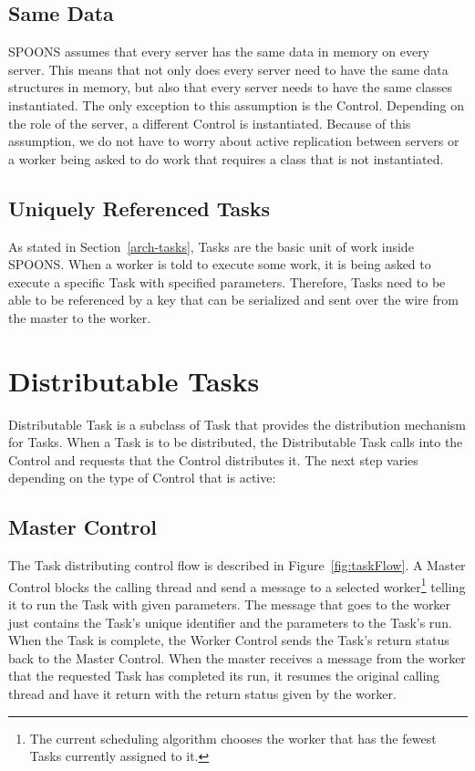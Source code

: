 \documentclass[12pt]{ucthesis}
\begin{document}
\subsection{Same Data}
SPOONS assumes that every server has the same data in memory on every server.
This means that not only does every server need to have the same data structures in memory,
but also that every server needs to have the same classes instantiated. The only exception to this
assumption is the Control. Depending on the role of the server, a different Control is
instantiated. Because of this assumption, we do not have to worry about active replication
between servers or a worker being asked to do work that requires a class that is not instantiated.

\subsection{Uniquely Referenced Tasks}
As stated in Section~\ref{arch-tasks}, Tasks are the basic unit of work inside SPOONS.
When a worker is told to execute some work, it is being asked to execute a specific Task with specified
parameters. Therefore, Tasks need to be able to be referenced by a key that can be serialized and
sent over the wire from the master to the worker.

\section{Distributable Tasks}
\label{arch-dist-tasks}
Distributable Task is a subclass of Task that provides the distribution mechanism for Tasks.
When a Task is to be distributed, the Distributable Task calls into the Control and requests that
the Control distributes it. The next step varies depending on the type of Control that is active:

\subsection{Master Control}
The Task distributing control flow is described in Figure~\ref{fig:taskFlow}.
A Master Control blocks the calling thread and send a message to a selected worker\footnote{The
current scheduling algorithm chooses the worker that has the fewest Tasks currently assigned to it.} telling it to
run the Task with given parameters. The message that goes to the worker just contains the Task's unique identifier
and the parameters to the Task's run. When the Task is complete, the Worker Control sends the Task's return
status back to the Master Control. When the master receives a message from the worker that the requested Task
has completed its run, it resumes the original calling thread and have it return with the return status given
by the worker.
\end{document}
